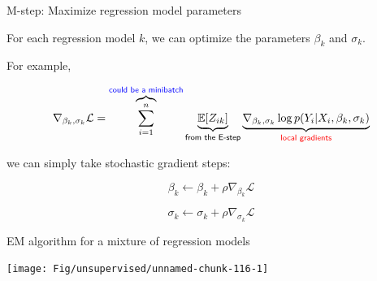 \documentclass[
  ignorenonframetext,
  aspectratio=169]{beamer}
\begin{document}
\begin{frame}{M-step: Maximize regression model parameters}
\protect\hypertarget{m-step-maximize-regression-model-parameters}{}
\scriptsize

\normalsize

For each regression model \(k\), we can optimize the parameters
\(\beta_{k}\) and \(\sigma_{k}\).

For example,

\[\nabla_{\beta_{k}, \sigma_{k}} \mathcal{L} = 
\overbrace{\sum_{i=1}^{n}}^{\textsf{\color{blue} could be a minibatch}}
\underbrace{\mathbb{E}\!\left[Z_{ik}\right]}_{\textsf{from the E-step}} 
\underbrace{\nabla_{\beta_{k}, \sigma_{k}} \log p(Y_{i}|X_{i}, \beta_{k}, \sigma_{k})}_{\textsf{\color{red} local gradients}}\]

we can simply take stochastic gradient steps:

\[\beta_{k} \gets \beta_{k} + \rho \nabla_{\beta_{k}} \mathcal{L}\]

\[\sigma_{k} \gets \sigma_{k} + \rho \nabla_{\sigma_{k}} \mathcal{L}\]

\scriptsize

\normalsize
\end{frame}

\begin{frame}{EM algorithm for a mixture of regression models}
\protect\hypertarget{em-algorithm-for-a-mixture-of-regression-models}{}
\scriptsize

\begin{center}\texttt{[image: Fig/unsupervised/unnamed-chunk-116-1]} \end{center}

\normalsize
\end{frame}
\end{document}
